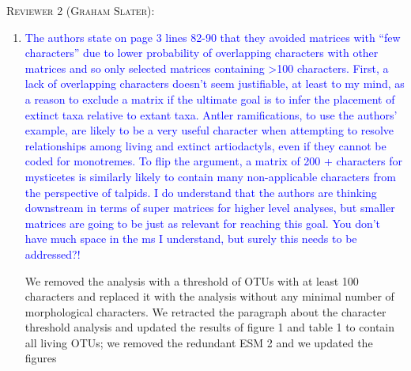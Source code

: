 \documentclass[12pt,letterpaper]{article}
\renewcommand{\section}[1]{%
\bigskip
\begin{center}
\begin{Large}
\normalfont\scshape #1
\medskip
\end{Large}
\end{center}}
\begin{document}
\section{Reviewer 2 (Graham Slater):}
\begin{enumerate}
\item{\textcolor{blue}{The authors state on page 3 lines 82-90 that they avoided matrices with ``few characters'' due to lower probability of overlapping characters with other matrices and so only selected matrices containing >100 characters. First, a lack of overlapping characters doesn’t seem justifiable, at least to my mind, as a reason to exclude a matrix if the ultimate goal is to infer the placement of extinct taxa relative to extant taxa. Antler ramifications, to use the authors' example, are likely to be a very useful character when attempting to resolve relationships among living and extinct artiodactyls, even if they cannot be coded for monotremes. To flip the argument, a matrix of 200 + characters for mysticetes is similarly likely to contain many non-applicable characters from the perspective of talpids. I do understand that the authors are thinking downstream in terms of super matrices for higher level analyses, but smaller matrices are going to be just as relevant for reaching this goal. You don't have much space in the ms I understand, but surely this needs to be addressed?!}}

We removed the analysis with a threshold of OTUs with at least 100 characters and replaced it with the analysis without any minimal number of morphological characters.
We retracted the paragraph about the character threshold analysis and updated the results of figure 1 and table 1 to contain all living OTUs; we removed the redundant ESM 2 and we updated the figures


\end{enumerate}
\end{document}
